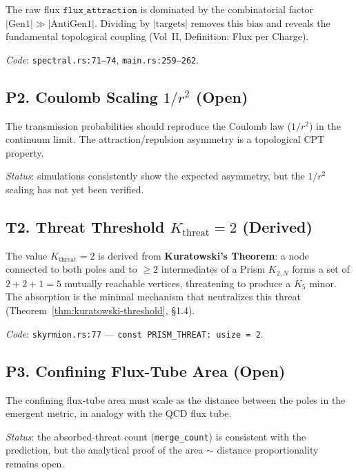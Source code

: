 The raw flux $\texttt{flux\_attraction}$ is dominated by the
combinatorial factor $|\text{Gen1}| \gg |\text{AntiGen1}|$. Dividing by
$|\text{targets}|$ removes this bias and reveals the fundamental
topological coupling (Vol~II, Definition: Flux per Charge).

\medskip\noindent
\textit{Code}: \texttt{spectral.rs:71--74},
\texttt{main.rs:259--262}.

\subsection*{P2. Coulomb Scaling $1/r^2$ (Open)}
\label{open:coulomb-scaling}

The transmission probabilities should reproduce the Coulomb
law ($1/r^2$) in the continuum limit. The
attraction/repulsion asymmetry is a topological CPT property.

\medskip\noindent
\textit{Status}: simulations consistently show the
expected asymmetry, but the $1/r^2$ scaling has not yet been
verified.

\subsection*{T2. Threat Threshold $K_{\text{threat}} = 2$ (Derived)}
\label{thm-ref:k-threat}

The value $K_{\text{threat}} = 2$ is derived from \textbf{Kuratowski's
Theorem}: a node connected to both poles and to $\geq 2$ intermediates
of a Prism $K_{2,N}$ forms a set of $2 + 2 + 1 = 5$ mutually
reachable vertices, threatening to produce a $K_5$ minor. The
absorption is the minimal mechanism that neutralizes this threat
(Theorem~\ref{thm:kuratowski-threshold}, \S1.4).

\medskip\noindent
\textit{Code}: \texttt{skyrmion.rs:77} ---
\texttt{const PRISM\_THREAT: usize = 2}.

\subsection*{P3. Confining Flux-Tube Area (Open)}
\label{open:flux-tube-area}

The confining flux-tube area must scale as the distance
between the poles in the emergent metric, in analogy with the QCD
flux tube.

\medskip\noindent
\textit{Status}: the absorbed-threat count
(\texttt{merge\_count}) is consistent with the prediction, but the
analytical proof of the area $\sim$ distance proportionality
remains open.

